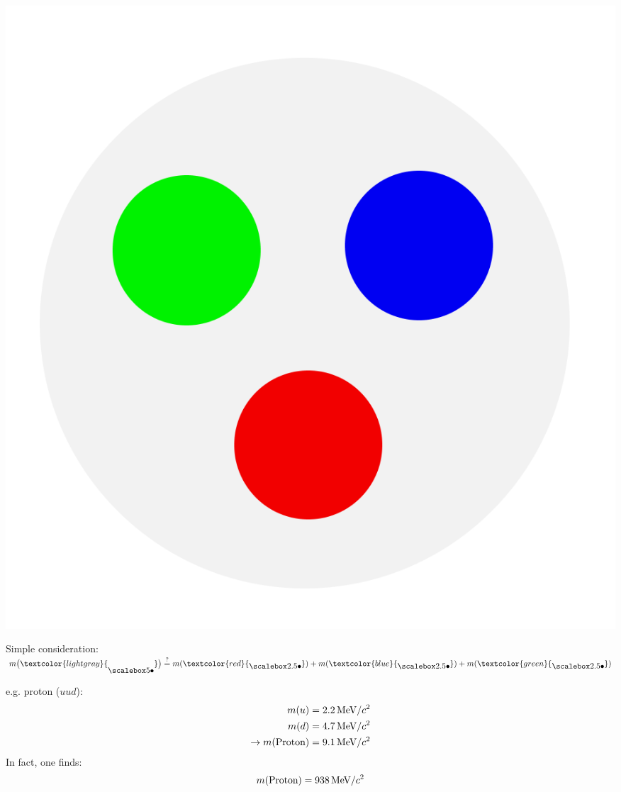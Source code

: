 \subsection{}
\begin{frame}
\begin{minipage} {0.3\textwidth}
\includegraphics[width=\textwidth]{Figures Introductory Lecture/Standard Model/Hadron_coloured.png}
\end{minipage}
\begin{minipage} {0.65\textwidth}
Simple consideration:\\  $m\big( \textcolor{lightgray}{ \BigbulletG}\big)\overset{?}{=}m(\textcolor{red}{\Bigbullet})+m(\textcolor{blue}{\Bigbullet})+m(\textcolor{green}{\Bigbullet})$
\end{minipage}
e.g. proton ($uud$):\\
\begin{align*} 
m(u)&=2.2  \,\textmd{MeV}/c^2\\m(d)&= 4.7 \, \textmd{MeV}/c^2 \\ \rightarrow m(\textmd{Proton})&=9.1  \,\textmd{MeV}/c^2
\end{align*} 
In fact, one finds:
\begin{align*} 
m(\textmd{Proton})=938  \,\textmd{MeV}/c^2
\end{align*} 
\end{frame}
